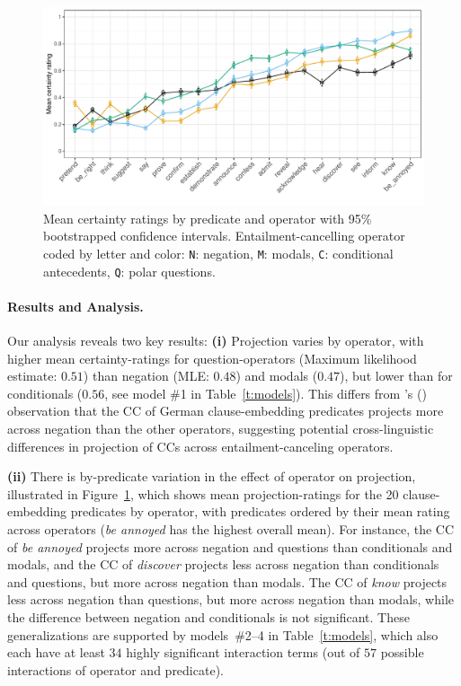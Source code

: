 \documentclass[11pt, a4paper]{article}
\newcommand{\posscite}[1]{\citeauthor{#1}'s (\citeyear{#1})}
\begin{document}
\begin{figure}[ht]
	\vspace{-.5\baselineskip}
	\centering
	\includegraphics[width=\textwidth]{graphs/proj-by-both.pdf}
	\caption{\small Mean certainty ratings by predicate and operator with 95\% bootstrapped confidence intervals. Entailment-cancelling operator coded by letter and color:  \textcolor{orangee}{\texttt{N}: negation}, \texttt{M}: modals, \textcolor{greenn}{\texttt{C}: conditional antecedents}, \textcolor{bluee}{\texttt{Q}: polar questions}.}
	\label{fig:figure1}
\end{figure}

\paragraph{Results and Analysis.}
	Our analysis reveals two key results: \textbf{(i)} Projection varies by operator, with higher mean certainty-ratings for question-operators (Maximum likelihood estimate: $0.51$) than negation (MLE: $0.48$) and modals ($0.47$), but lower than for conditionals ($0.56$, see model \#1 in Table\ \ref{t:models}).
	This differs from \posscite{sieker_projective_2022} observation that the CC of German clause-embedding predicates projects more across negation than the other operators, suggesting potential cross-linguistic differences in projection of CCs across entailment-canceling operators.
	
	\textbf{(ii)} There is by-predicate variation in the effect of operator on projection, illustrated in Figure~\ref{fig:figure1}, which shows mean projection-ratings for the 20 clause-embedding predicates by operator, with predicates ordered by their mean rating across operators (\emph{be annoyed} has the highest overall mean).
	For instance, the CC of \emph{be annoyed} projects more across negation and questions than conditionals and modals, and the CC of \emph{discover} projects less across negation than conditionals and questions, but more across negation than modals. The CC of \emph{know} projects less across negation than questions, but more across negation than modals, while the difference between negation and conditionals is not significant.
	These generalizations are supported by models\ \#2--4 in Table\ \ref{t:models}, which also each have at least $34$ highly significant interaction terms (out of $57$ possible interactions of operator and predicate).
\end{document}
